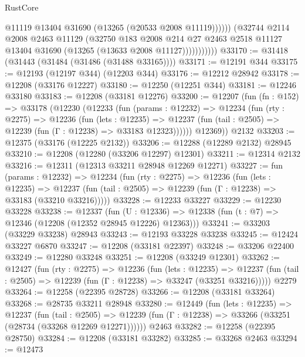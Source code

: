 \begin{lexlean}{RustCore}
\begin{coremodule}
                          @11119
                          @13404
                          @31690
                          (@13265 (@20533 @2008 @11119))))))
                  (@32744
                    @2114
                    @2008
                    @2463
                    @11129
                    (@32750
                      @183
                      @2008
                      @214
                      @27
                      @2463
                      @2518
                      @11127
                      @13404
                      @31690
                      (@13265 (@13633 @2008 @11127)))))))))))
@33170 := @31418 (@31443 (@31484 (@31486 (@31488 @33165))))
@33171 := @12191 @344
@33175 := @12193 (@12197 @344) (@12203 @344)
@33176 := @12212 @28942
@33178 := @12208 (@33176 @12227)
@33180 := @12250 (@12251 @344)
@33181 := @12246 @33180
@33183 := @12208 (@33181 @12276)
@33200 := @12207
    (fun (fn : @152) =>
    @33178
      (@12230
        (@12233
          (fun (params : @12232) =>
          @12234
            (fun (rty : @2275) =>
            @12236
              (fun (lets : @12235) =>
              @12237 (fun (tail : @2505) => @12239 (fun (Γ : @12238) => @33183 @12323))))))
        @12369))
    @2132
@33203 := @12375 (@33176 (@12225 @2132))
@33206 := @12288 (@12289 @2132) @28945
@33210 := @12208 (@12280 (@33206 @12297) @12301)
@33211 := @12314 @2132
@33216 := @12311 (@12313 @33211 @28948 @12269 @12271)
@33227 := fun (params : @12232) =>
  @12234
    (fun (rty : @2275) =>
    @12236
      (fun (lets : @12235) =>
      @12237 (fun (tail : @2505) => @12239 (fun (Γ : @12238) => @33183 (@33210 @33216)))))
@33228 := @12233 @33227
@33229 := @12230 @33228
@33238 := @12337
    (fun (U : @12336) => @12338 (fun (t : @7) => @12346 (@12208 (@12352 @28945 @12226) @12363)))
@33241 := @33203 (@33229 @33238) @28943
@33243 := @12193 @33228 @33238
@33245 := @12424 @33227 @6870
@33247 := @12208 (@33181 @22397)
@33248 := @33206 @22400
@33249 := @12280 @33248
@33251 := @12208 (@33249 @12301)
@33262 := @12427
    (fun (rty : @2275) =>
    @12236
      (fun (lets : @12235) =>
      @12237 (fun (tail : @2505) => @12239 (fun (Γ : @12238) => @33247 (@33251 @33216)))))
    @2279
@33264 := @12258 (@22395 @28728)
@33266 := @12208 (@33181 @33264)
@33268 := @28735 @33211 @28948
@33280 := @12449
    (fun (lets : @12235) =>
    @12237
      (fun (tail : @2505) =>
      @12239 (fun (Γ : @12238) => @33266 (@33251 (@28734 (@33268 @12269 @12271))))))
    @2463
@33282 := @12258 (@22395 @28750)
@33284 := @12208 (@33181 @33282)
@33285 := @33268 @2463
@33294 := @12473

\end{coremodule}
\end{lexlean}
